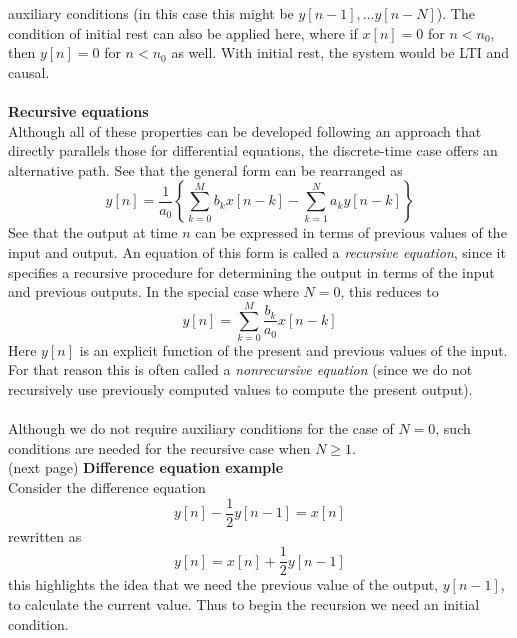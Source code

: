 \documentclass{report}
\begin{document}
auxiliary conditions (in this case this might be $y[n-1],\ldots y[n-N]$). 
The condition of initial rest can also be applied here, where if $x[n]=0$ for $n<n_0$, then $y[n]=0$ for $n<n_0$
as well. With initial rest, the system would be LTI and causal.\\
\vspace{1mm}\\
\textbf{Recursive equations}\\
Although all of these properties can be developed following an approach that directly parallels those for differential equations, the
discrete-time case offers an alternative path. See that the general form can be rearranged as
\begin{equation*}
y[n]=\frac{1}{a_0}\left\{\sum^M_{k=0}b_kx[n-k]-\sum^N_{k=1}a_ky[n-k]\right\}
\end{equation*}
See that the output at time $n$ can be expressed in terms of previous values of the input and output. An equation of this form is called 
a \textit{recursive equation}, since it specifies a recursive procedure for determining the output in terms of the input and previous
outputs. In the special case where $N=0$, this reduces to
\begin{equation*}
y[n]=\sum^M_{k=0}\frac{b_k}{a_0}x[n-k]
\end{equation*}
Here $y[n]$ is an explicit function of the present and previous values of the input. For that reason this is often called a
\textit{nonrecursive equation} (since we do not recursively use previously computed values to compute the present output).\\
\vspace{1mm}\\
Although we do not require auxiliary conditions for the case of $N=0$, such conditions are needed for the recursive case when $N\geq1$.\\
(next page)\newpage
\noindent\textbf{Difference equation example}\\
Consider the difference equation
\begin{equation*}
y[n]-\frac{1}{2}y[n-1]=x[n]
\end{equation*}
rewritten as
\begin{equation*}
y[n]=x[n]+\frac{1}{2}y[n-1]
\end{equation*}
this highlights the idea that we need the previous value of the output, $y[n-1]$, to calculate the current value. Thus to begin the
recursion we need an initial condition.\\
\vspace{1mm}\\
\end{document}
